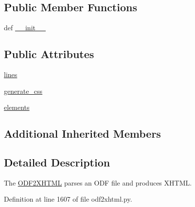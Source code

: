 \subsection*{Public Member Functions}
\begin{DoxyCompactItemize}
\item 
def \hyperlink{classodf_1_1odf2xhtml_1_1ODF2XHTMLembedded_a1f4a9e1ecdb1204f5b750c2fc5917e06}{\+\_\+\+\_\+init\+\_\+\+\_\+}
\end{DoxyCompactItemize}
\subsection*{Public Attributes}
\begin{DoxyCompactItemize}
\item 
\hyperlink{classodf_1_1odf2xhtml_1_1ODF2XHTMLembedded_aac8ee539c2c420fadc3947e39b50d8da}{lines}
\item 
\hyperlink{classodf_1_1odf2xhtml_1_1ODF2XHTMLembedded_a0271b378d97423c436f51aef5ea2f23e}{generate\+\_\+css}
\item 
\hyperlink{classodf_1_1odf2xhtml_1_1ODF2XHTMLembedded_ad727c7214206007cac1568a02aec4831}{elements}
\end{DoxyCompactItemize}
\subsection*{Additional Inherited Members}


\subsection{Detailed Description}
The \hyperlink{classodf_1_1odf2xhtml_1_1ODF2XHTML}{O\+D\+F2\+X\+H\+T\+M\+L} parses an O\+D\+F file and produces X\+H\+T\+M\+L. 

Definition at line 1607 of file odf2xhtml.\+py.



